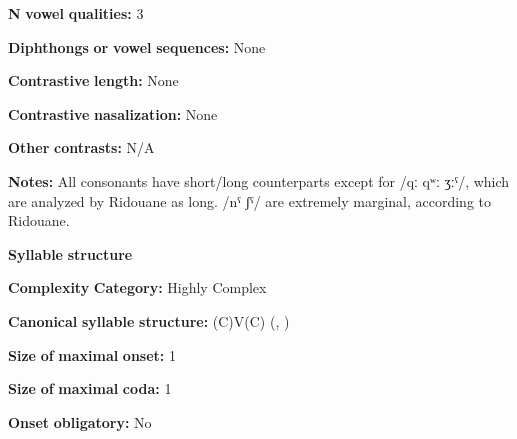\documentclass[output=paper]{langsci/langscibook}
\begin{document}
\begin{styleBody}
\textbf{N} \textbf{vowel} \textbf{qualities:} 3
\end{styleBody}

\begin{styleBody}
\textbf{Diphthongs} \textbf{or} \textbf{vowel} \textbf{sequences:} None
\end{styleBody}

\begin{styleBody}
\textbf{Contrastive} \textbf{length:} None
\end{styleBody}

\begin{styleBody}
\textbf{Contrastive} \textbf{nasalization:} None
\end{styleBody}

\begin{styleBody}
\textbf{Other} \textbf{contrasts:} N/A
\end{styleBody}

\begin{styleBody}
\textbf{Notes:} All consonants have short/long counterparts except for /qː qʷː ʒːˤ/, which are analyzed by Ridouane as long. /nˤ ʃˤ/ are extremely marginal, according to Ridouane.
\end{styleBody}

\begin{styleBody}
\textbf{Syllable} \textbf{structure}
\end{styleBody}

\begin{styleBody}
\textbf{Complexity} \textbf{Category:} Highly Complex
\end{styleBody}

\begin{styleBody}
\textbf{Canonical} \textbf{syllable} \textbf{structure:} (C)V(C) (\citealt{DellElmedlouai2002}, \citealt{Ridouane2008})
\end{styleBody}

\begin{styleBody}
\textbf{Size} \textbf{of} \textbf{maximal} \textbf{onset:} 1
\end{styleBody}

\begin{styleBody}
\textbf{Size} \textbf{of} \textbf{maximal} \textbf{coda:} 1
\end{styleBody}

\begin{styleBody}
\textbf{Onset} \textbf{obligatory:} No
\end{styleBody}
\end{document}
